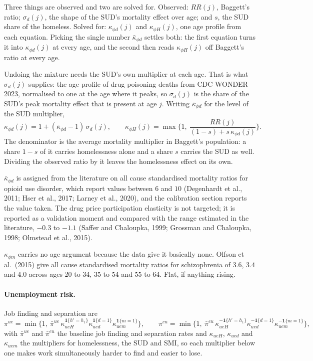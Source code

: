\documentclass[10pt]{article}
\begin{document}
Three things are observed and two are solved for. Observed: $RR(j)$,
Baggett's ratio; $\sigma_d(j)$, the shape of the SUD's mortality effect over age;
and $s$, the SUD share of the homeless. Solved for: $\kappa_{\phi d}(j)$ and
$\kappa_{\phi H}(j)$, one age profile from each equation. Picking the single
number $\bar\kappa_{\phi d}$ settles both: the first equation turns it into
$\kappa_{\phi d}(j)$ at every age, and the second then reads
$\kappa_{\phi H}(j)$ off Baggett's ratio at every age.

Undoing the mixture needs the SUD's own multiplier at each age. That is what
$\sigma_d(j)$ supplies: the age profile of drug poisoning deaths from CDC WONDER 2023,
normalised to one at the age where it peaks, so $\sigma_d(j)$ is the share of the
SUD's peak mortality effect that is present at age $j$. Writing
$\bar\kappa_{\phi d}$ for the level of the SUD multiplier,
\begin{equation}\label{eq:fhaz}
\kappa_{\phi d}(j) = 1+(\bar\kappa_{\phi d}-1)\,\sigma_d(j),
\qquad
\kappa_{\phi H}(j) = \max\Big\{1,\ \frac{RR(j)}{(1-s)+s\,\kappa_{\phi d}(j)}\Big\}.
\end{equation}
The denominator is the average mortality multiplier in Baggett's population:
a share $1-s$ of it carries homelessness alone and a share $s$ carries the SUD as
well. Dividing the observed ratio by it leaves the homelessness effect on its
own.

$\bar\kappa_{\phi d}$ is assigned from the literature on all cause
standardised mortality ratios for opioid use disorder, which report values
between $6$ and $10$ (Degenhardt et al., 2011; Hser et al., 2017; Larney et al.,
2020), and the calibration section reports the value taken. The drug price
participation elasticity is not targeted; it is reported as a validation moment
and compared with the range estimated in the literature, $-0.3$ to $-1.1$
(Saffer and Chaloupka, 1999; Grossman and Chaloupka, 1998; Olmstead et al.,
2015).

$\kappa_{\phi m}$ carries no age argument because the data give it basically
none. Olfson et al.\ (2015) give all
cause standardised mortality ratios for schizophrenia of $3.6$, $3.4$ and $4.0$
across ages 20 to 34, 35 to 54 and 55 to 64. Flat, if anything rising.

\paragraph{Unemployment risk.} Job finding and separation are
\begin{equation}\label{eq:femp}
\pi^{ue}=\min\Big\{1,\ \bar\pi^{ue}\,\kappa_{ueH}^{\mathbf{1}\{h'=h_1\}}
\kappa_{ued}^{\mathbf{1}\{d=1\}}\kappa_{uem}^{\mathbf{1}\{m=1\}}\Big\},
\qquad
\pi^{eu}=\min\Big\{1,\ \bar\pi^{eu}\,\kappa_{ueH}^{-\mathbf{1}\{h'=h_1\}}
\kappa_{ued}^{-\mathbf{1}\{d=1\}}\kappa_{uem}^{-\mathbf{1}\{m=1\}}\Big\},
\end{equation}
with $\bar\pi^{ue}$ and $\bar\pi^{eu}$ the baseline job finding and
separation rates and $\kappa_{ueH}$, $\kappa_{ued}$ and $\kappa_{uem}$ the
multipliers for homelessness, the SUD and SMI, so each multiplier
below one makes work simultaneously harder to find and easier to lose.
\end{document}
